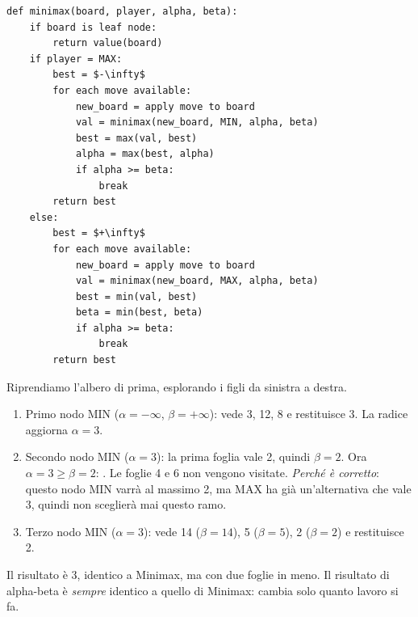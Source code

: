 \begin{lstlisting}[style=pseudo]
def minimax(board, player, alpha, beta):
    if board is leaf node:
        return value(board)
    if player = MAX:
        best = $-\infty$
        for each move available:
            new_board = apply move to board
            val = minimax(new_board, MIN, alpha, beta)
            best = max(val, best)
            alpha = max(best, alpha)
            if alpha >= beta:
                break
        return best
    else:
        best = $+\infty$
        for each move available:
            new_board = apply move to board
            val = minimax(new_board, MAX, alpha, beta)
            best = min(val, best)
            beta = min(best, beta)
            if alpha >= beta:
                break
        return best
\end{lstlisting}

\begin{extra}
Riprendiamo l'albero di prima, esplorando i figli da sinistra a destra.
\begin{enumerate}
  \item Primo nodo MIN ($\alpha=-\infty$, $\beta=+\infty$): vede 3, 12, 8 e restituisce 3.
        La radice aggiorna $\alpha = 3$.
  \item Secondo nodo MIN ($\alpha=3$): la prima foglia vale 2, quindi $\beta = 2$.
        Ora $\alpha = 3 \geq \beta = 2$: . Le foglie 4 e 6 non vengono visitate.
        \emph{Perché è corretto}: questo nodo MIN varrà al massimo 2, ma MAX ha già
        un'alternativa che vale 3, quindi non sceglierà mai questo ramo.
  \item Terzo nodo MIN ($\alpha=3$): vede 14 ($\beta=14$), 5 ($\beta=5$), 2 ($\beta=2$) e restituisce 2.
\end{enumerate}
Il risultato è 3, identico a Minimax, ma con due foglie in meno. Il risultato di alpha-beta
è \emph{sempre} identico a quello di Minimax: cambia solo quanto lavoro si fa.

\begin{center}
\end{center}
\end{extra}

